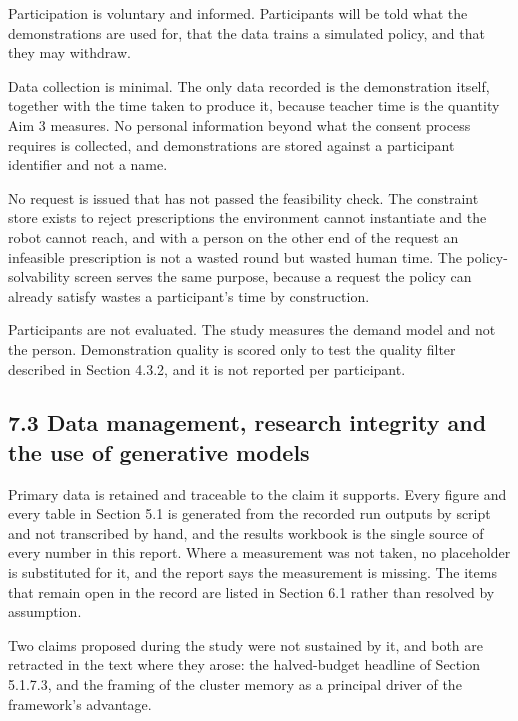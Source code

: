 \documentclass[
  11pt,
]{article}
\begin{document}
Participation is voluntary and informed. Participants will be told what
the demonstrations are used for, that the data trains a simulated
policy, and that they may withdraw.

Data collection is minimal. The only data recorded is the demonstration
itself, together with the time taken to produce it, because teacher time
is the quantity Aim 3 measures. No personal information beyond what the
consent process requires is collected, and demonstrations are stored
against a participant identifier and not a name.

No request is issued that has not passed the feasibility check. The
constraint store exists to reject prescriptions the environment cannot
instantiate and the robot cannot reach, and with a person on the other
end of the request an infeasible prescription is not a wasted round but
wasted human time. The policy-solvability screen serves the same
purpose, because a request the policy can already satisfy wastes a
participant's time by construction.

Participants are not evaluated. The study measures the demand model and
not the person. Demonstration quality is scored only to test the quality
filter described in Section 4.3.2, and it is not reported per
participant.

\hypertarget{data-management-research-integrity-and-the-use-of-generative-models}{%
\subsection{7.3 Data management, research integrity and the use of
generative
models}\label{data-management-research-integrity-and-the-use-of-generative-models}}

Primary data is retained and traceable to the claim it supports. Every
figure and every table in Section 5.1 is generated from the recorded run
outputs by script and not transcribed by hand, and the results workbook
is the single source of every number in this report. Where a measurement
was not taken, no placeholder is substituted for it, and the report says
the measurement is missing. The items that remain open in the record are
listed in Section 6.1 rather than resolved by assumption.

Two claims proposed during the study were not sustained by it, and both
are retracted in the text where they arose: the halved-budget headline
of Section 5.1.7.3, and the framing of the cluster memory as a principal
driver of the framework's advantage.
\end{document}
